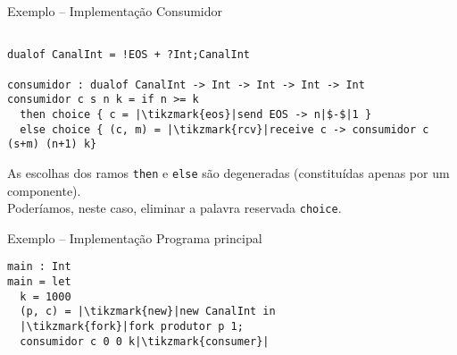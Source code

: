 \begin{frame}[fragile]{Exemplo -- Implementação  \hfill \color{mLightBrown}Consumidor}
  \begin{lstlisting}[xleftmargin=-.04\textwidth]

dualof CanalInt = !EOS + ?Int;CanalInt
    
consumidor : dualof CanalInt -> Int -> Int -> Int -> Int
consumidor c s n k = if n >= k
  then choice { c = |\tikzmark{eos}|send EOS -> n|$-$|1 }
  else choice { (c, m) = |\tikzmark{rcv}|receive c -> consumidor c (s+m) (n+1) k}
\end{lstlisting}


 
\begin{tcolorbox}
  As escolhas dos ramos \lstinline|then| e \lstinline|else| são degeneradas (constituídas apenas por um componente).\\
  Poderíamos, neste caso, eliminar a palavra reservada \lstinline|choice|.
\end{tcolorbox}

\end{frame}

\begin{frame}[fragile]{Exemplo -- Implementação  \hfill \color{mLightBrown}Programa principal}
  \begin{lstlisting}[xleftmargin=.2\textwidth, xrightmargin=.15\textwidth]
main : Int
main = let
  k = 1000
  (p, c) = |\tikzmark{new}|new CanalInt in
  |\tikzmark{fork}|fork produtor p 1;
  consumidor c 0 0 k|\tikzmark{consumer}|
\end{lstlisting}



\end{frame}


 
